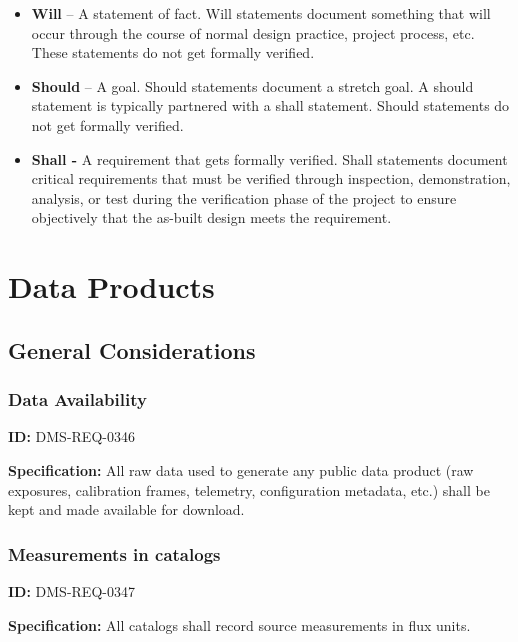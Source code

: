 \documentclass[SE,toc,lsstdraft]{lsstdoc}
\begin{document}
\begin{itemize}
 \item{\textbf{Will} – A statement of fact. Will statements document something that will occur through the course of normal design practice, project process, etc. These statements do not get formally verified. }
 \item{\textbf{Should} – A goal. Should statements document a stretch goal. A should statement is typically partnered with a shall statement. Should statements do not get formally verified. }
 \item{\textbf{Shall - }A requirement that gets formally verified. Shall statements document critical requirements that must be verified through inspection, demonstration, analysis, or test during the verification phase of the project to ensure objectively that the as-built design meets the requirement. }
\end{itemize}

\section{Data Products}





\subsection{General Considerations}





\subsubsection{Data Availability}

\label{DMS-REQ-0346}
\textbf{ID:} DMS-REQ-0346

\textbf{Specification: }All raw data used to generate any public data product (raw exposures, calibration frames, telemetry, configuration metadata, etc.) shall be kept and made available for download.






\subsubsection{Measurements in catalogs}

\label{DMS-REQ-0347}
\textbf{ID:} DMS-REQ-0347

\textbf{Specification: }All catalogs shall record source measurements in flux units.
\end{document}
